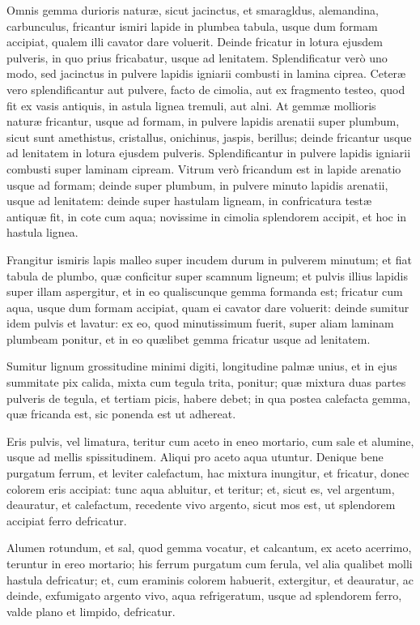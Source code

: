 \documentclass[a4paper, 11pt, oneside, polutonikogreek, italian]{article}
\begin{document}
Omnis gemma durioris naturæ, sicut jacinctus, et smaragldus, alemandina, carbunculus, fricantur ismiri lapide in plumbea tabula, usque dum formam accipiat, qualem illi cavator dare voluerit. Deinde fricatur in lotura ejusdem pulveris, in quo prius fricabatur, usque ad lenitatem. Splendificatur verò uno modo, sed jacinctus in pulvere lapidis igniarii combusti in lamina ciprea. Ceteræ vero splendificantur aut pulvere, facto de cimolia, aut ex fragmento testeo, quod fit ex vasis antiquis, in astula lignea tremuli, aut alni. At gemmæ mollioris naturæ fricantur, usque ad formam, in pulvere lapidis arenatii super plumbum, sicut sunt amethistus, cristallus, onichinus, jaspis, berillus; deinde fricantur usque ad lenitatem in lotura ejusdem pulveris. Splendificantur in pulvere lapidis igniarii combusti super laminam cipream. Vitrum verò fricandum est in lapide arenatio usque ad formam; deinde super plumbum, in pulvere minuto lapidis arenatii, usque ad lenitatem: deinde super hastulam ligneam, in confricatura testæ antiquæ fit, in cote cum aqua; novissime in cimolia splendorem accipit, et hoc in hastula lignea.

Frangitur ismiris lapis malleo super incudem durum in pulverem minutum; et fiat tabula de plumbo, quæ conficitur super scamnum ligneum; et pulvis illius lapidis super illam aspergitur, et in eo qualiscunque gemma formanda est; fricatur cum aqua, usque dum formam accipiat, quam ei cavator dare voluerit: deinde sumitur idem pulvis et lavatur: ex eo, quod minutissimum fuerit, super aliam laminam plumbeam ponitur, et in eo quælibet gemma fricatur usque ad lenitatem.

Sumitur lignum grossitudine minimi digiti, longitudine palmæ unius, et in ejus summitate pix calida, mixta cum tegula trita, ponitur; quæ mixtura duas partes pulveris de tegula, et tertiam picis, habere debet; in qua postea calefacta gemma, quæ fricanda est, sic ponenda est ut adhereat.

Eris pulvis, vel limatura, teritur cum aceto in eneo mortario, cum sale et alumine, usque ad mellis spissitudinem. Aliqui pro aceto aqua utuntur. Denique bene purgatum ferrum, et leviter calefactum, hac mixtura inungitur, et fricatur, donec colorem eris accipiat: tunc aqua abluitur, et teritur; et, sicut es, vel argentum, deauratur, et calefactum, recedente vivo argento, sicut mos est, ut splendorem accipiat ferro defricatur.

Alumen rotundum, et sal, quod gemma vocatur, et calcantum, ex aceto acerrimo, teruntur in ereo mortario; his ferrum purgatum cum ferula, vel alia qualibet molli hastula defricatur; et, cum eraminis colorem habuerit, extergitur, et deauratur, ac deinde, exfumigato argento vivo, aqua refrigeratum, usque ad splendorem ferro, valde plano et limpido, defricatur.
\end{document}

